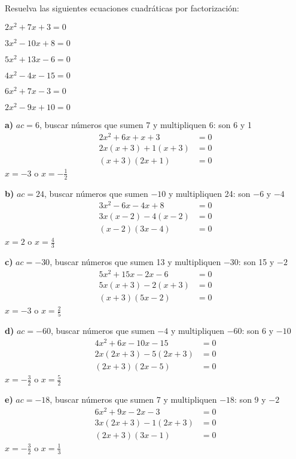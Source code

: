 \begin{exercise}
\problem Resuelva las siguientes ecuaciones cuadráticas por factorización:

\begin{exerciselist}
    \item $2x^2 + 7x + 3 = 0$
    \item $3x^2 - 10x + 8 = 0$
    \item $5x^2 + 13x - 6 = 0$
    \item $4x^2 - 4x - 15 = 0$
    \item $6x^2 + 7x - 3 = 0$
    \item $2x^2 - 9x + 10 = 0$
\end{exerciselist}

\begin{solucion}
\textbf{a)} $ac = 6$, buscar números que sumen 7 y multipliquen 6: son 6 y 1
\begin{align*}
2x^2 + 6x + x + 3 &= 0\\
2x(x + 3) + 1(x + 3) &= 0\\
(x + 3)(2x + 1) &= 0
\end{align*}
$x = -3$ o $x = -\frac{1}{2}$

\textbf{b)} $ac = 24$, buscar números que sumen $-10$ y multipliquen 24: son $-6$ y $-4$
\begin{align*}
3x^2 - 6x - 4x + 8 &= 0\\
3x(x - 2) - 4(x - 2) &= 0\\
(x - 2)(3x - 4) &= 0
\end{align*}
$x = 2$ o $x = \frac{4}{3}$

\textbf{c)} $ac = -30$, buscar números que sumen 13 y multipliquen $-30$: son 15 y $-2$
\begin{align*}
5x^2 + 15x - 2x - 6 &= 0\\
5x(x + 3) - 2(x + 3) &= 0\\
(x + 3)(5x - 2) &= 0
\end{align*}
$x = -3$ o $x = \frac{2}{5}$

\textbf{d)} $ac = -60$, buscar números que sumen $-4$ y multipliquen $-60$: son 6 y $-10$
\begin{align*}
4x^2 + 6x - 10x - 15 &= 0\\
2x(2x + 3) - 5(2x + 3) &= 0\\
(2x + 3)(2x - 5) &= 0
\end{align*}
$x = -\frac{3}{2}$ o $x = \frac{5}{2}$

\textbf{e)} $ac = -18$, buscar números que sumen 7 y multipliquen $-18$: son 9 y $-2$
\begin{align*}
6x^2 + 9x - 2x - 3 &= 0\\
3x(2x + 3) - 1(2x + 3) &= 0\\
(2x + 3)(3x - 1) &= 0
\end{align*}
$x = -\frac{3}{2}$ o $x = \frac{1}{3}$


\end{solucion}
\end{exercise}
